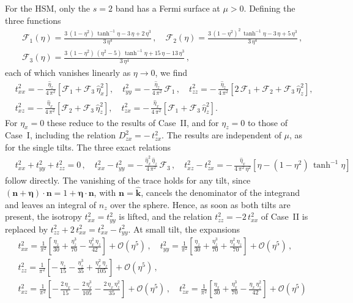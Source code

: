 \documentclass[aps,prb,onecolumn,nofootinbib,citeautoscript,10pt]{revtex4-2}
\newcommand{\bs}[1]{\boldsymbol{#1}}
\def \nn{\nonumber \\}
\begin{document}
For the HSM, only the $s=2$ band has a Fermi surface at $\mu>0$. Defining the three functions
\begin{align}
\label{eqFhopf}
& \mathcal F_1 (\eta) = \frac{3\,(1-\eta^2)\,\tanh^{-1}\eta - 3\,\eta + 2\,\eta^3}{3\,\eta^4}\,, \quad
\mathcal F_2 (\eta) = \frac{3\,(1-\eta^2)^2\,\tanh^{-1}\eta - 3\,\eta + 5\,\eta^3}{3\,\eta^4}\,, \nn &
\mathcal F_3 (\eta) = \frac{3\,(1-\eta^2)\,(\eta^2-5)\,\tanh^{-1}\eta + 15\,\eta - 13\,\eta^3}{3\,\eta^4}\,,
\end{align}
each of which vanishes linearly as $\eta\to0$, we find
\begin{align}
\label{eqhopfcomb}
& t^2_{xx} = -\,\frac{\hat\eta_z}{4\,\pi^2} \left[ \mathcal F_1 + \mathcal F_3\,\hat\eta_x^2 \right] , \quad
t^2_{yy} = -\,\frac{\hat\eta_z}{4\,\pi^2}\, \mathcal F_1 \,, \quad
t^2_{zz} = -\,\frac{\hat\eta_z}{4\,\pi^2} \left[ 2\,\mathcal F_1 + \mathcal F_2 + \mathcal F_3\,\hat\eta_z^2 \right] , \nn &
t^2_{xz} = -\,\frac{\hat\eta_x}{4\,\pi^2} \left[ \mathcal F_2 + \mathcal F_3\,\hat\eta_z^2 \right] , \quad
t^2_{zx} = -\,\frac{\hat\eta_x}{4\,\pi^2} \left[ \mathcal F_1 + \mathcal F_3\,\hat\eta_z^2 \right] .
\end{align}
For $\eta_x=0$ these reduce to the results of Case~II, and for $\eta_z=0$ to those of Case~I, including the relation $D^2_{zx}=-\,t^2_{zx}$. The results are independent of $\mu$, as for the single tilts. The three exact relations
\begin{align}
\label{eqhopfrel}
& t^2_{xx}+t^2_{yy}+t^2_{zz} = 0 \,, \quad
t^2_{xx}-t^2_{yy} = -\,\frac{\hat\eta_x^2\,\hat\eta_z}{4\,\pi^2}\,\mathcal F_3 \,, \quad
t^2_{xz}-t^2_{zx} = -\,\frac{\hat\eta_x}{4\,\pi^2\,\eta^2} \left[ \eta - (1-\eta^2)\,\tanh^{-1}\eta \right]
\end{align}
follow directly. The vanishing of the trace holds for any tilt, since $(\bs n+\bs\eta)\cdot\bs n=1+\bs\eta\cdot\bs n$, with $\bs n=\hat{\bs k}$, cancels the denominator of the integrand and leaves an integral of $n_z$ over the sphere. Hence, as soon as both tilts are present, the isotropy $t^2_{xx}=t^2_{yy}$ is lifted, and the relation $t^2_{zz}=-2\,t^2_{xx}$ of Case~II is replaced by $t^2_{zz}+2\,t^2_{xx}=t^2_{xx}-t^2_{yy}$. At small tilt, the expansions
\begin{align}
\label{eqhopfser}
& t^2_{xx} = \frac{1}{\pi^2} \left[ \frac{\eta_z}{30} + \frac{\eta_z^3}{70} - \frac{\eta_x^2\,\eta_z}{42} \right] + \mathcal O(\eta^5)\,, \quad
t^2_{yy} = \frac{1}{\pi^2} \left[ \frac{\eta_z}{30} + \frac{\eta_z^3}{70} + \frac{\eta_x^2\,\eta_z}{70} \right] + \mathcal O(\eta^5)\,, \nn &
t^2_{zz} = \frac{1}{\pi^2} \left[ -\,\frac{\eta_z}{15} - \frac{\eta_z^3}{35} + \frac{\eta_x^2\,\eta_z}{105} \right] + \mathcal O(\eta^5)\,, \nn &
t^2_{xz} = \frac{1}{\pi^2} \left[ -\,\frac{2\,\eta_x}{15} - \frac{2\,\eta_x^3}{105} - \frac{2\,\eta_x\,\eta_z^2}{35} \right] + \mathcal O(\eta^5)\,, \quad
t^2_{zx} = \frac{1}{\pi^2} \left[ \frac{\eta_x}{30} + \frac{\eta_x^3}{70} - \frac{\eta_x\,\eta_z^2}{42} \right] + \mathcal O(\eta^5)
\end{align}
\end{document}
